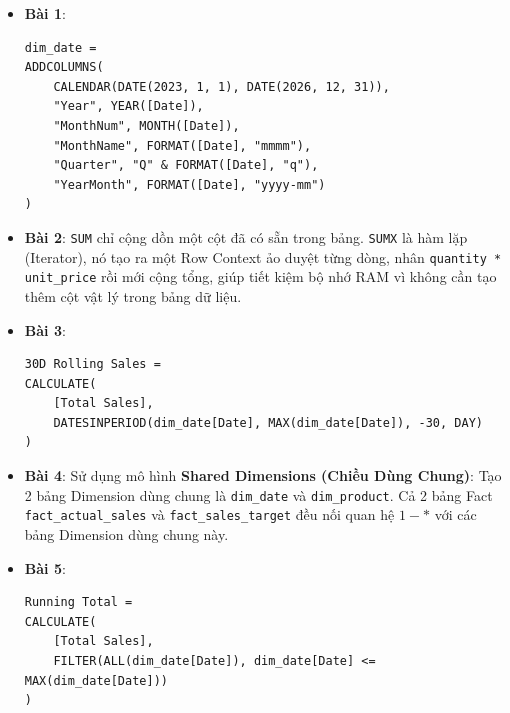\begin{dapanbox}
\begin{itemize}
    \item \textbf{Bài 1}:
    \begin{lstlisting}
dim_date = 
ADDCOLUMNS(
    CALENDAR(DATE(2023, 1, 1), DATE(2026, 12, 31)),
    "Year", YEAR([Date]),
    "MonthNum", MONTH([Date]),
    "MonthName", FORMAT([Date], "mmmm"),
    "Quarter", "Q" & FORMAT([Date], "q"),
    "YearMonth", FORMAT([Date], "yyyy-mm")
)
    \end{lstlisting}
    \item \textbf{Bài 2}: \texttt{SUM} chỉ cộng dồn một cột đã có sẵn trong bảng. \texttt{SUMX} là hàm lặp (Iterator), nó tạo ra một Row Context ảo duyệt từng dòng, nhân \texttt{quantity * unit\_price} rồi mới cộng tổng, giúp tiết kiệm bộ nhớ RAM vì không cần tạo thêm cột vật lý trong bảng dữ liệu.
    \item \textbf{Bài 3}:
    \begin{lstlisting}
30D Rolling Sales = 
CALCULATE(
    [Total Sales],
    DATESINPERIOD(dim_date[Date], MAX(dim_date[Date]), -30, DAY)
)
    \end{lstlisting}
    \item \textbf{Bài 4}: Sử dụng mô hình \textbf{Shared Dimensions (Chiều Dùng Chung)}: Tạo 2 bảng Dimension dùng chung là \texttt{dim\_date} và \texttt{dim\_product}. Cả 2 bảng Fact \texttt{fact\_actual\_sales} và \texttt{fact\_sales\_target} đều nối quan hệ $1 - *$ với các bảng Dimension dùng chung này.
    \item \textbf{Bài 5}:
    \begin{lstlisting}
Running Total = 
CALCULATE(
    [Total Sales],
    FILTER(ALL(dim_date[Date]), dim_date[Date] <= MAX(dim_date[Date]))
)
    \end{lstlisting}
\end{itemize}
\end{dapanbox}
